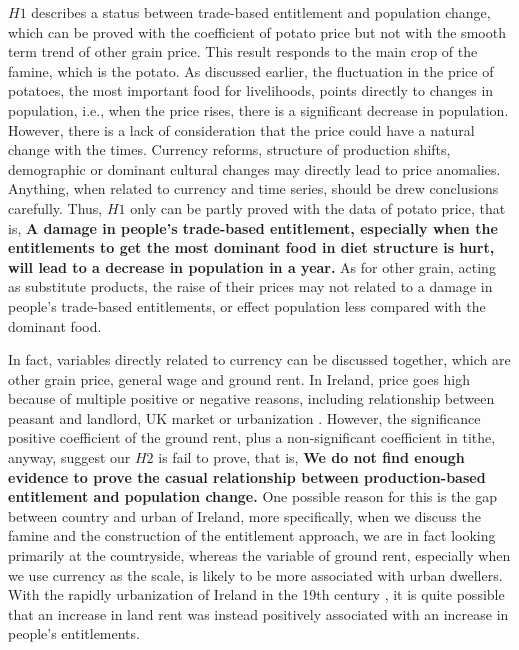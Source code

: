 $H1$ describes a status between trade-based entitlement and population change, which can be proved with the coefficient of potato price but not with the smooth term trend of other grain price. This result responds to the main crop of the famine, which is the potato. As discussed earlier, the fluctuation in the price of potatoes, the most important food for livelihoods, points directly to changes in population, i.e., when the price rises, there is a significant decrease in population. However, there is a lack of consideration that the price could have a natural change with the times. Currency reforms, structure of production shifts, demographic or dominant cultural changes may directly lead to price anomalies. Anything, when related to currency and time series, should be drew conclusions carefully. Thus, $H1$ only can be partly proved with the data of potato price, that is, \textbf{A damage in people's trade-based entitlement, especially when the entitlements to get the most dominant food in diet structure is hurt, will lead to a decrease in population in a year.} As for other grain, acting as substitute products, the raise of their prices may not related to a damage in people's trade-based entitlements, or effect population less compared with the dominant food.

In fact, variables directly related to currency can be discussed together, which are other grain price, general wage and ground rent. In Ireland, price goes high because of multiple positive or negative reasons, including relationship between peasant and landlord, UK market or urbanization \citep{kennedy2014markets}. However, the significance positive coefficient of the ground rent, plus a non-significant coefficient in tithe, anyway, suggest our $H2$ is fail to prove, that is, \textbf{We do not find enough evidence to prove the casual relationship between production-based entitlement and population change.} One possible reason for this is the gap between country and urban of Ireland, more specifically, when we discuss the famine and the construction of the entitlement approach, we are in fact looking primarily at the countryside, whereas the variable of ground rent, especially when we use currency as the scale, is likely to be more associated with urban dwellers. With the rapidly urbanization of Ireland in the 19th century \citep{graham1992landlords}, it is quite possible that an increase in land rent was instead positively associated with an increase in people's entitlements.

